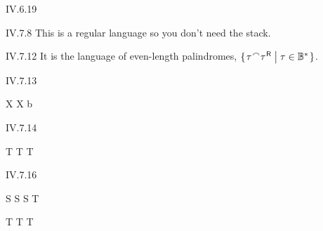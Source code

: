 %
\begin{ans}{IV.6.19}
\end{ans}
%
%
%
\begin{ans}{IV.7.8}
This is a regular language so you don't need the stack.
\end{ans}
%
%
%
%
\begin{ans}{IV.7.12}
It is the language of even-length palindromes,
$\set{\tau\concat\reversal{\tau}\suchthat \tau\in\kleenestar{\B}}$.
\end{ans}
%
\begin{ans}{IV.7.13}
\begin{grammar}
X \produces{} X
              \syntaxor b
\end{grammar}
\end{ans}
%
\begin{ans}{IV.7.14}
\begin{grammar}
T \produces{} T
              \syntaxor {}T
              \syntaxor {}
\end{grammar}
\end{ans}
%
%
\begin{ans}{IV.7.16}
\begin{grammar}
S \produces{} S \syntaxor {}S
   \syntaxor {}T
   \syntaxor {} \syntaxor {} \syntaxor {} \syntaxor \emptystring

T \produces{} T \syntaxor {}T
  \syntaxor {} \syntaxor {} \syntaxor {} \syntaxor \emptystring
\end{grammar}
\end{ans}
%
%
